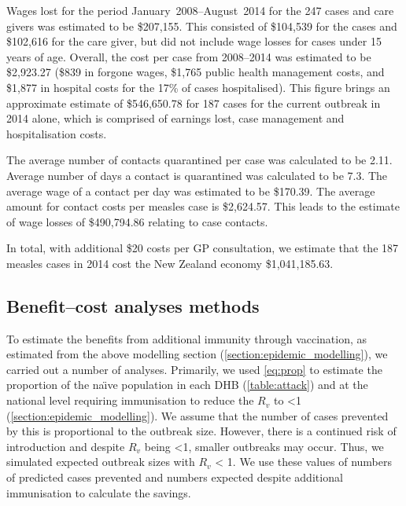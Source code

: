 \documentclass{article}
\begin{document}
Wages lost for the period January~2008--August~2014 for the 247 cases and care givers was estimated to be \$207,155. This consisted of \$104,539 for the cases and \$102,616 for the care giver, but did not include wage losses for cases under 15 years of age. Overall, the cost per case from 2008--2014 was estimated to be \$2,923.27 (\$839 in forgone wages, \$1,765 public health management costs, and \$1,877 in hospital costs for the 17\% of cases hospitalised). This figure brings an approximate estimate of \$546,650.78 for 187 cases for the current outbreak in 2014 alone, which is comprised of earnings lost, case management and hospitalisation costs.

The average number of contacts quarantined per case was calculated to be 2.11. Average number of days a contact is quarantined was calculated to be 7.3. The average wage of a contact per day was estimated to be \$170.39. The average amount for contact costs per measles case is \$2,624.57. This leads to the estimate of wage losses of \$490,794.86 relating to case contacts.

In total, with additional \$20 costs per GP consultation, we estimate that the 187 measles cases in 2014 cost the New Zealand economy \$1,041,185.63.

\subsection{Benefit--cost analyses methods}
\label{sub:cost_benefit}

To estimate the benefits from additional immunity through vaccination, as estimated from the above modelling section (\autoref{section:epidemic_modelling}), we carried out a number of analyses. Primarily, we used \autoref{eq:prop} to estimate the proportion of the na\"{\i}ve population in each DHB (\autoref{table:attack}) and at the national level requiring immunisation to reduce the $R_v$ to <1 (\autoref{section:epidemic_modelling}). We assume that the number of cases prevented by this is proportional to the outbreak size. However, there is a continued risk of introduction and despite $R_v$ being <1, smaller outbreaks may occur. Thus, we simulated expected outbreak sizes with $R_v$ < 1. We use these values of numbers of predicted cases prevented and numbers expected despite additional immunisation to calculate the savings. 
\end{document}
